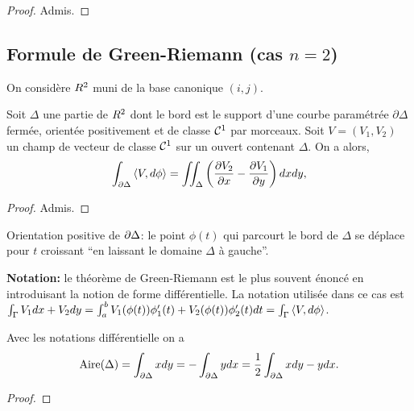 \begin{proof}
Admis.
\end{proof}
\subsection{Formule de Green-Riemann (cas $n=2$)}

On considère  $R^2$ muni de la base canonique $(i,j)$.

\begin{theorem}
	Soit $\Delta$ une partie de $R^2$ dont le bord est le support d'une courbe paramétrée $\partial \Delta$ fermée, orientée positivement et de classe $\mathcal{C}^1$ par morceaux.  Soit $V = (V_1, V_2)$ un champ de vecteur de classe $\mathcal{C}^1$ sur un ouvert contenant $\Delta$. On a alors,
	\[
		\int_{\partial \Delta} \left\langle V,d\phi\right\rangle = \iint_{\Delta} \left( \frac{\partial V_2}{\partial x} - \frac{\partial V_1}{\partial y} \right) dxdy,
	\]
\end{theorem}

\begin{proof}
	Admis.
\end{proof}

\begin{remark}
	Orientation positive de $\partial \Delta$: le point $\phi(t)$ qui parcourt le bord de $\Delta$ se déplace pour $t$ croissant ``en laissant le domaine $\Delta$ à gauche''.
\pl{\rep{3cm}}
\end{remark}

{\bf\sffamily Notation:}  le théorème de Green-Riemann est le plus souvent énoncé en introduisant la notion de forme différentielle. La notation utilisée dans ce cas est $\int_{\Gamma} V_1 dx + V_2 dy =  \int_a^b  V_1(\phi(t)) \phi_1'(t) + V_2(\phi(t)) \phi_2'(t) dt = \int_{\Gamma}\left\langle V,d\phi\right\rangle$. 


\begin{proposition}
	 Avec les notations différentielle on a
	\[\operatorname{Aire}(\Delta) = \int_{\partial \Delta} x dy = - \int_{\partial\Delta} y dx  = \frac{1}{2} \int_{\partial\Delta} x dy - ydx.\]
\end{proposition}

\begin{proof}
\pl{\rep{4cm}}	
\end{proof}

